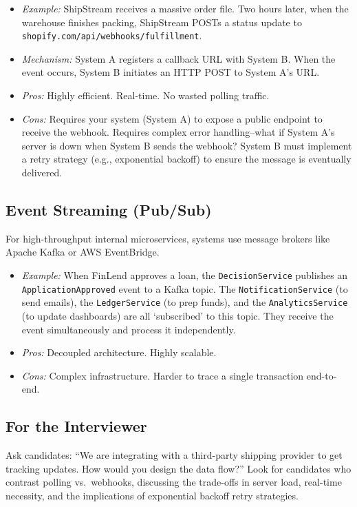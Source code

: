 \documentclass[
  11pt,
  openany,
  oneside]{book}
\providecommand{\tightlist}{%
  \setlength{\itemsep}{0pt}\setlength{\parskip}{0pt}}
\renewenvironment{quote}{\begin{customquote}}{\end{customquote}}
\begin{document}
\begin{itemize}
\tightlist
\item
  \emph{Example:} ShipStream receives a massive order file. Two hours
  later, when the warehouse finishes packing, ShipStream POSTs a status
  update to \texttt{shopify.com/api/webhooks/fulfillment}.
\item
  \emph{Mechanism:} System A registers a callback URL with System B.
  When the event occurs, System B initiates an HTTP POST to System A's
  URL.
\item
  \emph{Pros:} Highly efficient. Real-time. No wasted polling traffic.
\item
  \emph{Cons:} Requires your system (System A) to expose a public
  endpoint to receive the webhook. Requires complex error handling--what
  if System A's server is down when System B sends the webhook? System B
  must implement a retry strategy (e.g., exponential backoff) to ensure
  the message is eventually delivered.
\end{itemize}

\subsection{Event Streaming (Pub/Sub)}\label{event-streaming-pubsub}

For high-throughput internal microservices, systems use message brokers
like Apache Kafka or AWS EventBridge.

\begin{itemize}
\tightlist
\item
  \emph{Example:} When FinLend approves a loan, the
  \texttt{DecisionService} publishes an \texttt{ApplicationApproved}
  event to a Kafka topic. The \texttt{NotificationService} (to send
  emails), the \texttt{LedgerService} (to prep funds), and the
  \texttt{AnalyticsService} (to update dashboards) are all `subscribed'
  to this topic. They receive the event simultaneously and process it
  independently.
\item
  \emph{Pros:} Decoupled architecture. Highly scalable.
\item
  \emph{Cons:} Complex infrastructure. Harder to trace a single
  transaction end-to-end.
\end{itemize}

\begin{quote}
\subsection{For the Interviewer}\label{for-the-interviewer}

Ask candidates: ``We are integrating with a third-party shipping
provider to get tracking updates. How would you design the data flow?''
Look for candidates who contrast polling vs.~webhooks, discussing the
trade-offs in server load, real-time necessity, and the implications of
exponential backoff retry strategies.
\end{quote}
\end{document}
